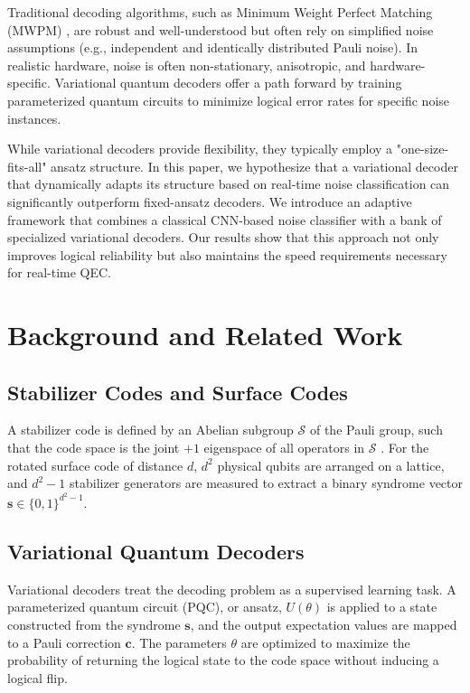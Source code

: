 \documentclass[journal,twocolumn]{IEEEtran}
\begin{document}
Traditional decoding algorithms, such as Minimum Weight Perfect Matching (MWPM) \cite{edmonds1965paths, higgott2021pymatching}, are robust and well-understood but often rely on simplified noise assumptions (e.g., independent and identically distributed Pauli noise). In realistic hardware, noise is often non-stationary, anisotropic, and hardware-specific. Variational quantum decoders \cite{peruzzo2014vqe, mitarai2018quantum} offer a path forward by training parameterized quantum circuits to minimize logical error rates for specific noise instances.

While variational decoders provide flexibility, they typically employ a "one-size-fits-all" ansatz structure. In this paper, we hypothesize that a variational decoder that dynamically adapts its structure based on real-time noise classification can significantly outperform fixed-ansatz decoders. We introduce an adaptive framework that combines a classical CNN-based noise classifier with a bank of specialized variational decoders. Our results show that this approach not only improves logical reliability but also maintains the speed requirements necessary for real-time QEC.

\section{Background and Related Work}

\subsection{Stabilizer Codes and Surface Codes}
A stabilizer code is defined by an Abelian subgroup $\mathcal{S}$ of the Pauli group, such that the code space is the joint $+1$ eigenspace of all operators in $\mathcal{S}$ \cite{fowler2012surface}. For the rotated surface code of distance $d$, $d^2$ physical qubits are arranged on a lattice, and $d^2-1$ stabilizer generators are measured to extract a binary syndrome vector $\mathbf{s} \in \{0,1\}^{d^2-1}$.

\subsection{Variational Quantum Decoders}
Variational decoders treat the decoding problem as a supervised learning task. A parameterized quantum circuit (PQC), or ansatz, $U(\theta)$ is applied to a state constructed from the syndrome $\mathbf{s}$, and the output expectation values are mapped to a Pauli correction $\mathbf{c}$. The parameters $\theta$ are optimized to maximize the probability of returning the logical state to the code space without inducing a logical flip.
\end{document}
